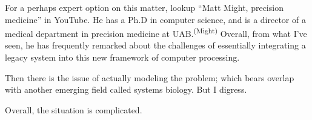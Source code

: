 For a perhaps expert option on this matter, lookup ``Matt Might, precision medicine'' in YouTube. He has a Ph.D in computer science, and is a director of a medical department in precision medicine at UAB.\textsuperscript{(Might)} Overall, from what I've seen, he has frequently remarked about the challenges of essentially integrating a legacy system into this new framework of computer processing.


Then there is the issue of actually modeling the problem; which bears overlap with another emerging field called systems biology. But I digress.

Overall, the situation is complicated.



